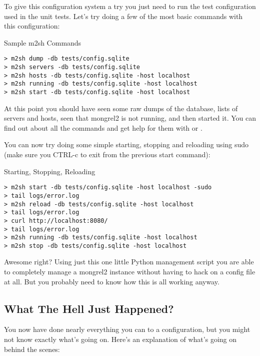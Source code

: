 To give this configuration system a try you just need to run the test configuration used
in the unit tests.  Let's try doing a few of the most basic commands with this configuration:

\begin{code}{Sample m2sh Commands}
\begin{verbatim}
> m2sh dump -db tests/config.sqlite
> m2sh servers -db tests/config.sqlite
> m2sh hosts -db tests/config.sqlite -host localhost
> m2sh running -db tests/config.sqlite -host localhost
> m2sh start -db tests/config.sqlite -host localhost
\end{verbatim}
\end{code}

At this point you should have seen some raw dumps of the database, lists of servers and hosts,
seen that mongrel2 is not running, and then started it.  You can find out about all the commands
and get help for them with  or .

You can now try doing some simple starting, stopping and reloading using sudo (make sure you CTRL-c
to exit from the previous start command):

\begin{code}{Starting, Stopping, Reloading}
\begin{verbatim}
> m2sh start -db tests/config.sqlite -host localhost -sudo
> tail logs/error.log
> m2sh reload -db tests/config.sqlite -host localhost
> tail logs/error.log
> curl http://localhost:8080/
> tail logs/error.log
> m2sh running -db tests/config.sqlite -host localhost
> m2sh stop -db tests/config.sqlite -host localhost
\end{verbatim}
\end{code}

Awesome right?  Using just this one little Python management script you 
are able to completely manage a mongrel2 instance without having to hack
on a config file at all.  But you probably need to know how this is all 
working anyway.


\subsection{What The Hell Just Happened?}

You now have done nearly everything you can to a configuration, but you might not know exactly
what's going on.  Here's an explanation of what's going on behind the scenes:

